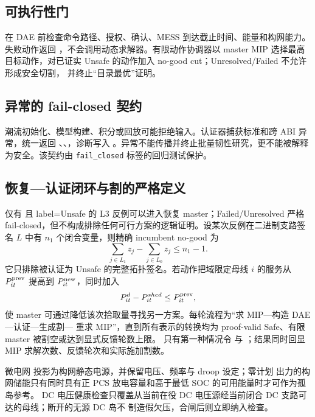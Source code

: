 \subsection{可执行性门}
在 DAE 前检查命令路径、授权、确认、MESS 到达截止时间、能量和构网能力。失败动作返回
，不会调用动态求解器。有限动作协调器以 master MIP
选择最高目标动作，对已证实 Unsafe 的动作加入 no-good cut；Unresolved/Failed 不允许形成安全切割，
并终止“目录最优”证明。

\subsection{异常的 fail-closed 契约}
潮流初始化、模型构建、积分或回放可能拒绝输入。认证器捕获标准和跨 ABI 异常，统一返回
、、，诊断写入
。异常不能传播并终止批量韧性研究，更不能被解释为安全。该契约由
\texttt{fail\_closed} 标签的回归测试保护。

\subsection{恢复—认证闭环与割的严格定义}
仅有  且 label=Unsafe 的 L3 反例可以进入恢复 master；Failed/Unresolved
严格 fail-closed，但不构成排除任何可行方案的逻辑证明。设某次反例在二进制支路签名 $L$ 中有
$n_1$ 个闭合变量，则精确 incumbent no-good 为
\begin{equation}
 \sum_{j\in L_1}z_j-\sum_{j\in L_0}z_j\le n_1-1.
\end{equation}
它只排除被认证为 Unsafe 的完整拓扑签名。若动作把域限定母线 $i$ 的服务从
$P^{\rm prev}_{it}$ 提高到 $P^{\rm new}_{it}$，同时加入
\begin{equation}
 P^{d}_{it}-P^{shed}_{it}\le P^{\rm prev}_{it},
\end{equation}
使 master 可通过降低该次拾取量寻找另一方案。每轮流程为“求 MIP---构造 DAE---认证---生成割---
重求 MIP”，直到所有表示的转换均为 proof-valid Safe、有限 master 被割空或达到显式反馈轮数上限。
只有第一种情况令  与
；结果同时回显 MIP 求解次数、反馈轮次和实际施加割数。

微电网  投影为构网静态电源，并保留电压、频率与 droop 设定；零计划
出力的构网储能只有同时具有正 PCS 放电容量和高于最低 SOC 的可用能量时才可作为孤岛参考。
DC 电压健康检查只覆盖从当前在役 DC 电压源经当前闭合 DC 支路可达的母线；断开的无源 DC 岛不
制造假欠压，合闸后则立即纳入检查。
